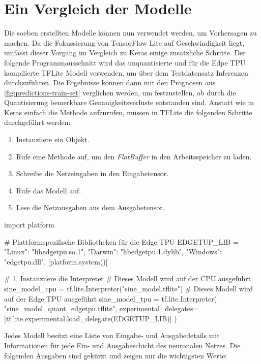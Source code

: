 \section{Ein Vergleich der Modelle}
Die soeben erstellten Modelle können nun verwendet werden, um
Vorhersagen zu machen.
Da die Fokussierung von TensorFlow Lite auf Geschwindigkeit
liegt, umfasst dieser Vorgang im Vergleich zu Keras einige
zusätzliche Schritte. Der folgende Programmausschnitt
wird das unquantisierte und für die Edpe TPU
kompilierte TFLite Modell verwenden, um über dem Testdatensatz Inferenzen
durchzuführen. Die Ergebnisse können dann mit den Prognosen
aus \autoref{fig:predictions-train-set} verglichen werden,
um festzustellen, ob durch die Quantisierung bemerkbare
Genauigkeitsverluste entstanden sind.
Anstatt wie in Keras einfach die 
Methode aufzurufen, müssen in TFLite die folgenden
Schritte durchgeführt werden:
\begin{enumerate}
  \item Instanziiere ein  Objekt.
  \item Rufe eine Methode auf, um den
        \textit{FlatBuffer} in den Arbeitsspeicher zu laden.
  \item Schreibe die Netzeingaben in den Eingabetensor.
  \item Rufe das Modell auf.
  \item Lese die Netzausgaben aus dem Ausgabetensor.
\end{enumerate}
\begin{pythoncode}
import platform

# Plattformspezifische Bibliotheken für die Edge TPU
EDGETUP_LIB = {
    "Linux": "libedgetpu.so.1",
    "Darwin": "libedgetpu.1.dylib",
    "Windows": "edgetpu.dll",
}[platform.system()]

# 1. Instanziiere die Interpreter
# Dieses Modell wird auf der CPU ausgeführt
sine_model_cpu = tf.lite.Interpreter("sine_model.tflite")
# Dieses Modell wird auf der Edge TPU ausgeführt
sine_model_tpu = tf.lite.Interpreter(
    "sine_model_quant_edgetpu.tflite",
    experimental_delegates=[tf.lite.experimental.load_delegate(EDGETUP_LIB)]
)
\end{pythoncode}
Jedes Modell besitzt eine Liste von Eingabe- und Ausgabedetails
mit Informationen für jede Ein- und Ausgabeschicht des neuronalen Netzes.
Die folgenden Ausgaben sind gekürzt und zeigen nur die wichtigsten Werte:
